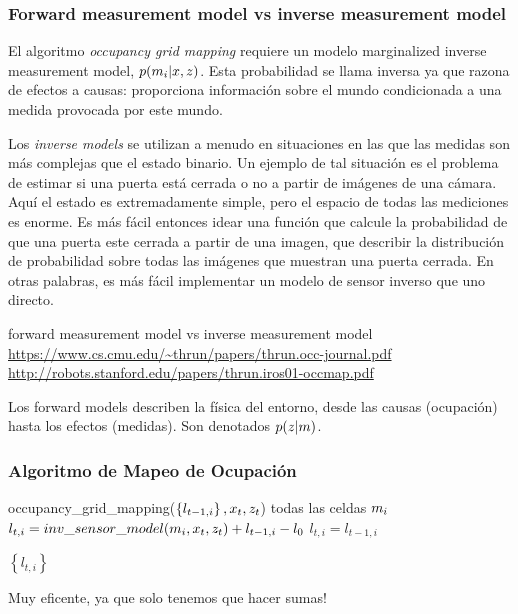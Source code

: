 \begin{frame}
	\frametitle{Forward measurement model vs inverse measurement model}
    
   
	El algoritmo \emph{occupancy grid mapping} requiere un modelo marginalized inverse measurement model, $p(m_{i}|x, z )$. Esta probabilidad se llama inversa ya que razona de efectos a causas: proporciona información sobre el mundo condicionada a una medida provocada por este mundo.

	Los \emph{inverse models} se utilizan a menudo en situaciones en las que las medidas son más complejas que el estado binario. Un ejemplo de tal situación es el problema de estimar si una puerta está cerrada o no a partir de imágenes de una cámara. Aquí el estado es extremadamente simple, pero el espacio de todas las mediciones es enorme. Es más fácil entonces idear una función que calcule la probabilidad de que una puerta este cerrada a partir de una imagen, que describir la distribución de probabilidad sobre todas las imágenes que muestran una puerta cerrada. En otras palabras, es más fácil implementar un modelo de sensor inverso que uno directo.
	
	
	forward measurement model vs inverse measurement model
	\url{https://www.cs.cmu.edu/~thrun/papers/thrun.occ-journal.pdf}
	\url{http://robots.stanford.edu/papers/thrun.iros01-occmap.pdf}
	
	Los forward models describen la física del entorno, desde las causas (ocupación) hasta los efectos (medidas). Son denotados $p(z | m)$.
	
\end{frame}

\begin{frame}
    \frametitle{Algoritmo de Mapeo de Ocupación}
    
   \begin{algorithmic}[1]
       \State occupancy\_grid\_mapping($\left\lbrace l_{t-1,i} \right\rbrace, x_{t}, z_{t}$)
       \For todas las celdas $m_{i}$
            \State $l_{t,i} = inv\_sensor\_model(m_{i}, x_{t}, z_{t}) + l_{t-1,i} - l_{0}$
       \Else
       \State $l_{t,i} = l_{t-1,i}$
       \EndIf
       \EndFor
       
       \State \Return $\left\lbrace l_{t,i} \right\rbrace$
   \end{algorithmic}
    Muy eficente, ya que solo tenemos que hacer sumas!

\end{frame}

